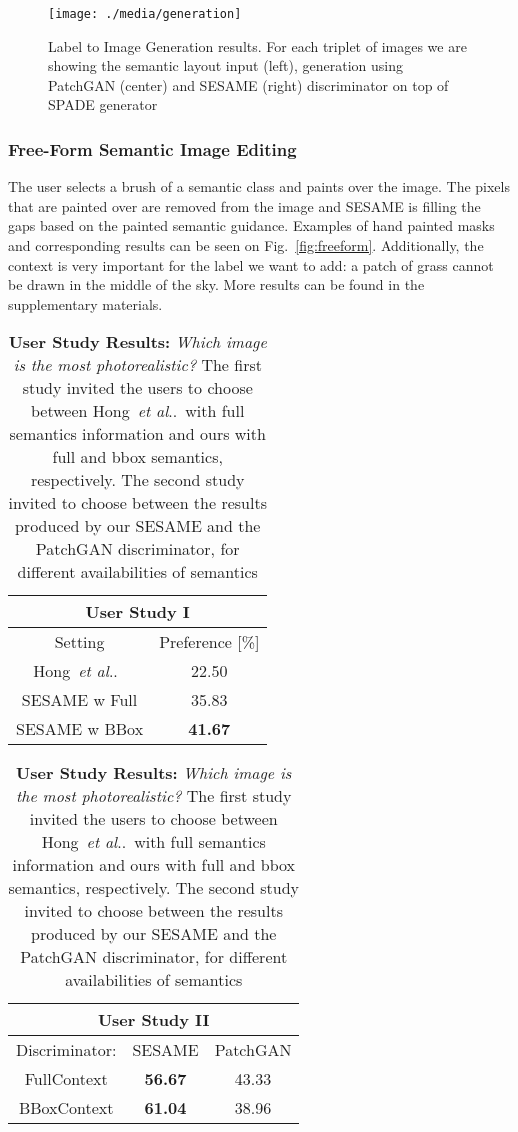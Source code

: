 \documentclass[runningheads]{llncs}
\makeatletter
\DeclareRobustCommand\onedot{\futurelet\@let@token\@onedot}
\def\@onedot{\ifx\@let@token.\else.\null\fi\xspace}
\def\etal{\emph{et al}\onedot}
\def\hong{Hong~\etal~\cite{hong2018learning}}
\newcommand{\fref}[1]{Fig.~\ref{#1}}
\newcommand{\aref}[1]{the supplementary materials}
\makeatother
\begin{document}
\begin{figure}[t]
\begin{center}
    \centering
    \texttt{[image: ./media/generation]}
    \caption{Label to Image Generation results. For each triplet of images we are showing the semantic layout input (left), generation using PatchGAN (center) and SESAME (right) discriminator on top of SPADE generator}
    \label{fig:generation}
\end{center}
\end{figure}

\subsubsection{Free-Form Semantic Image Editing}
\label{ss:freeform}

The user selects a brush of a semantic class and paints over the image.
The pixels that are painted over are removed from the image and SESAME is filling the gaps based on the painted semantic guidance.
Examples of hand painted masks and corresponding results can be seen on \fref{fig:freeform}.
Additionally, the context is very important for the label we want to add: a patch of grass cannot be drawn in the middle of the sky. More results can be found in \aref{}.

\begin{table}[t]
    \centering
    \caption{\textbf{User Study Results:} \textit{Which image is the most photorealistic?} The first study invited the users to choose between \hong with full semantics information and ours with full and bbox semantics, respectively. The second study invited to choose between the results produced by our SESAME and the PatchGAN discriminator, for different availabilities of semantics} \label{table:user_study}    
    \begin{tabular}{c|c}
    \multicolumn{2}{c}{User Study I}\\
    \hline
    Setting & Preference [\%]\\
    \hline
    \hong{} &  22.50 \\
    SESAME w Full &  35.83  \\
    SESAME w BBox &  \textbf{41.67} \\
    \end{tabular}
    \begin{tabular}{c|cc}
      \multicolumn{3}{c}{User Study II}\\
      \hline
    Discriminator: & SESAME & PatchGAN \\
    \hline
    FullContext & \textbf{56.67} & 43.33\\
    BBoxContext & \textbf{61.04} & 38.96\\
    \end{tabular}

\end{table}
\end{document}
